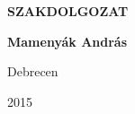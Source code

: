 \documentclass[a4paper, 12pt]{article}
\begin{document}
\thispagestyle{empty}

\begin{center}

\vspace*{4cm}
{\LARGE \bf SZAKDOLGOZAT}

\vspace*{8cm}
\begin{flushright}
{\large
\bf{Mamenyák András}
}
\end{flushright}

\vspace*{4cm}
{\Large Debrecen}

\vspace*{0.1cm}
{\Large 2015}

\end{center}
\end{document}
